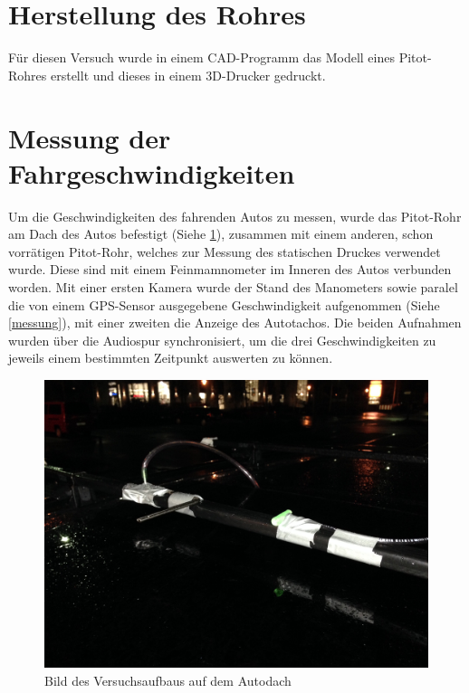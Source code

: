 \section{Herstellung des Rohres}
Für diesen Versuch wurde in einem CAD-Programm das Modell eines Pitot-Rohres erstellt und dieses in einem 3D-Drucker gedruckt.

\section{Messung der Fahrgeschwindigkeiten}
Um die Geschwindigkeiten des fahrenden Autos zu messen, wurde das Pitot-Rohr am Dach des Autos befestigt (Siehe \ref{rohre}), zusammen mit einem anderen, schon vorrätigen Pitot-Rohr, welches zur Messung des statischen Druckes verwendet wurde. Diese sind mit einem Feinmamnometer im Inneren des Autos verbunden worden. Mit einer ersten Kamera wurde der Stand des Manometers sowie paralel die von einem GPS-Sensor ausgegebene Geschwindigkeit aufgenommen (Siehe \ref{messung}), mit einer zweiten die Anzeige des Autotachos. Die beiden Aufnahmen wurden über die Audiospur synchronisiert, um die drei Geschwindigkeiten zu jeweils einem bestimmten Zeitpunkt auswerten zu können.

\begin{figure}
\centering
	\includegraphics[width=\textwidth]{images/rohre.jpg}
	\caption{Bild des Versuchsaufbaus auf dem Autodach}
	\label{rohre}
\end{figure}

